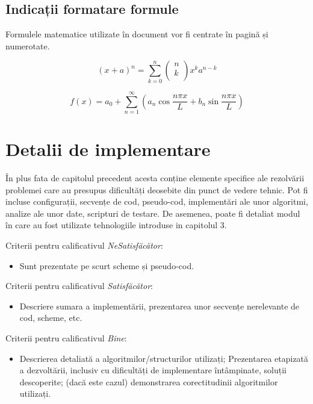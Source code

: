 \documentclass[12pt,a4paper]{report}
\begin{document}
\section{Indicații formatare formule}
Formulele matematice utilizate în document vor fi centrate în pagină și numerotate. 

\begin{equation}
(x+a)^n = \sum_{k=0}^{n}\left(\begin{array}{c}n\\k\\\end{array}\right)x^ka^{n-k}
\end{equation}

\begin{equation}
f(x) = a_0 + \sum_{n=1}^{\infty}\left(a_n \cos\frac{n\pi x}{L} + b_n\sin\frac{n\pi x}{L}\right)
\end{equation}



\chapter{Detalii de implementare}
În plus fata de capitolul precedent acesta conține elemente specifice ale rezolvării problemei care au presupus dificultăți deosebite din punct de vedere tehnic. Pot fi incluse configurații, secvențe de cod, pseudo-cod, implementări ale unor algoritmi, analize ale unor date, scripturi de testare. De asemenea, poate fi detaliat modul în care au fost utilizate tehnologiile introduse in capitolul 3.


Criterii pentru calificativul \textit{Ne\textit{Satisfăcător}}: 
\begin{itemize}
	\item	Sunt prezentate pe scurt scheme și pseudo-cod.
\end{itemize}
Criterii pentru calificativul \textit{Satisfăcător}: 
\begin{itemize}
	\item	Descriere sumara a implementării, prezentarea unor secvențe nerelevante de cod, scheme, etc. 
\end{itemize}
Criterii pentru calificativul \textit{Bine}: 
\begin{itemize}
	\item	Descrierea detaliată a algoritmilor/structurilor utilizați; Prezentarea etapizată a dezvoltării, inclusiv cu dificultăți de implementare întâmpinate, soluții descoperite; (dacă este cazul) demonstrarea corectitudinii algoritmilor utilizați. 
\end{itemize}
\end{document}
